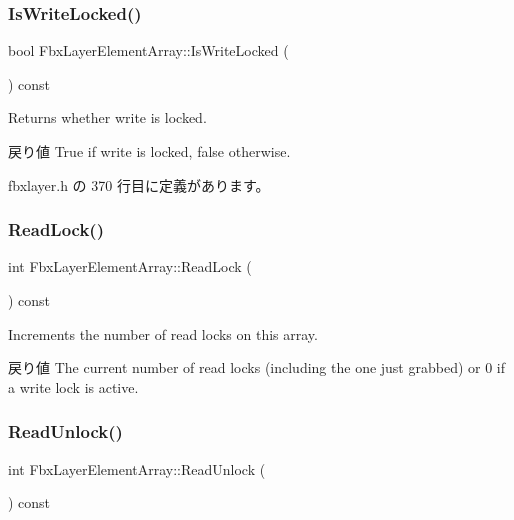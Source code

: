 \subsubsection{\texorpdfstring{Is\+Write\+Locked()}{IsWriteLocked()}}
{\footnotesize\ttfamily bool Fbx\+Layer\+Element\+Array\+::\+Is\+Write\+Locked (\begin{DoxyParamCaption}{ }\end{DoxyParamCaption}) const\hspace{0.3cm}{\ttfamily [inline]}}

Returns whether write is locked. \begin{DoxyReturn}{戻り値}
{\ttfamily True} if write is locked, {\ttfamily false} otherwise. 
\end{DoxyReturn}


 fbxlayer.\+h の 370 行目に定義があります。

\mbox{\label{class_fbx_layer_element_array_afb3f283bed4e92d60488f582bd58bf80}} 
\subsubsection{\texorpdfstring{Read\+Lock()}{ReadLock()}}
{\footnotesize\ttfamily int Fbx\+Layer\+Element\+Array\+::\+Read\+Lock (\begin{DoxyParamCaption}{ }\end{DoxyParamCaption}) const}

Increments the number of read locks on this array. \begin{DoxyReturn}{戻り値}
The current number of read locks (including the one just grabbed) or 0 if a write lock is active. 
\end{DoxyReturn}
\mbox{\label{class_fbx_layer_element_array_a75a18c8aecb5dc8c68c05c02bd54d7f4}} 
\subsubsection{\texorpdfstring{Read\+Unlock()}{ReadUnlock()}}
{\footnotesize\ttfamily int Fbx\+Layer\+Element\+Array\+::\+Read\+Unlock (\begin{DoxyParamCaption}{ }\end{DoxyParamCaption}) const}

